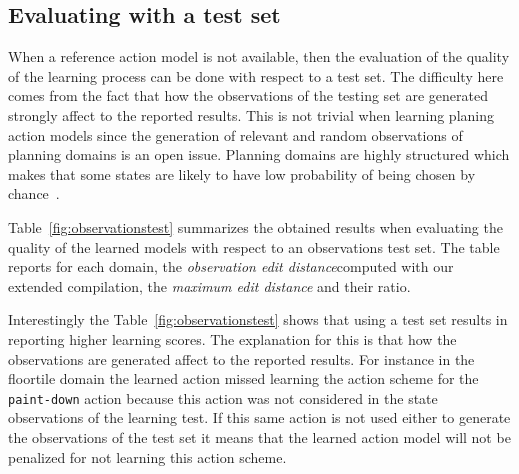 \documentclass{article}
\begin{document}
\subsection{Evaluating with a test set}
When a reference action model is not available, then the evaluation of the quality of the learning process can be done with respect to a test set. The difficulty here comes from the fact that how the observations of the testing set are generated strongly affect to the reported results. This is not trivial when learning planing action models since the generation of relevant and random observations of planning domains is an open issue. Planning domains are highly structured which makes that some states are likely to have low probability of being chosen by chance~\cite{fern2004learning}.

Table~\ref{fig:observationstest} summarizes the obtained results when evaluating the quality of the learned models with respect to an observations test set. The table reports for each domain, the {\em observation edit distance}computed with our extended compilation, the {\em maximum edit distance} and their ratio.

Interestingly the Table~\ref{fig:observationstest} shows that using a test set results in reporting higher learning scores. The explanation for this is that how the observations are generated affect to the reported results. For instance in the floortile domain the learned action missed learning the action scheme for the {\tt paint-down} action because this action was not considered in the state observations of the learning test. If this same action is not used either to generate the observations of the test set it means that the learned action model will not be penalized for not learning this action scheme. 
\end{document}
